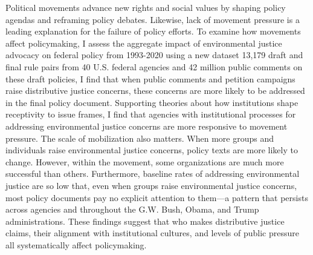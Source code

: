 Political movements advance new rights and social values by shaping policy agendas and reframing policy debates. Likewise, lack of movement pressure is a leading explanation for the failure of policy efforts. To examine how movements affect policymaking, I assess the aggregate impact of environmental justice advocacy on federal policy from 1993-2020 using a new dataset 13,179 draft and final rule pairs from 40 U.S. federal agencies and 42 million public comments on these draft policies, I find that when public comments and petition campaigns raise distributive justice concerns, these concerns are more likely to be addressed in the final policy document. Supporting theories about how institutions shape receptivity to issue frames, I find that agencies with institutional processes for addressing environmental justice concerns are more responsive to movement pressure. The scale of mobilization also matters. When more groups and individuals raise environmental justice concerns, policy texts are more likely to change. However, within the movement, some organizations are much more successful than others. Furthermore, baseline rates of addressing environmental justice are so low that, even when groups raise environmental justice concerns, most policy documents pay no explicit attention to them---a pattern that persists across agencies and throughout the G.W. Bush, Obama, and Trump administrations. These findings suggest that who makes distributive justice claims, their alignment with institutional cultures, and levels of public pressure all systematically affect policymaking.